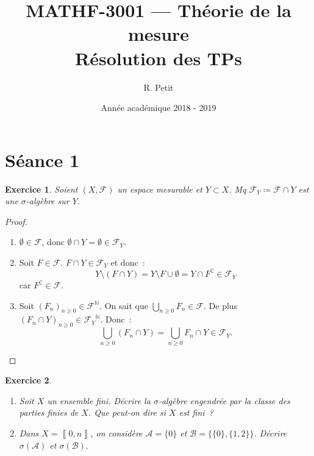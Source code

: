 \documentclass{article}
\title{MATHF-3001 --- Théorie de la mesure \\Résolution des TPs}
\author{R. Petit}
\date{Année académique 2018 - 2019}
\newtheorem{ex}{Exercice}[section]
\theoremstyle{definition}
\newcommand{\C}{\complement}
\newcommand{\N}{{\mathbb N}}
\newcommand{\intint}[2]{\left\llbracket#1, #2\right\rrbracket}
\begin{document}
\maketitle

\section{Séance 1}

\begin{ex} Soient $(X, \mathcal F)$ un espace mesurable et $Y \subset X$. Mq $\mathcal F_Y \coloneqq \mathcal F \cap Y$ est une $\sigma$-algèbre sur $Y$.
\end{ex}

\begin{proof}~
\begin{enumerate}
	\item $\emptyset \in \mathcal F$, donc $\emptyset \cap Y = \emptyset \in \mathcal F_Y$.
	\item Soit $F \in \mathcal F$. $F \cap Y \in \mathcal F_Y$ et donc~:
	\[Y \setminus (F \cap Y) = Y \setminus F \cup \emptyset = Y \cap F^\C \in \mathcal F_Y\]
	car $F^\C \in \mathcal F$.
	\item Soit $(F_n)_{n \geq 0} \in \mathcal F^\N$. On sait que $\bigcup_{n \geq 0}F_n \in \mathcal F$. De plus $(F_n \cap Y)_{n \geq 0} \in {\mathcal F_Y}^\N$. Donc~:
	\[\bigcup_{n \geq 0}(F_n \cap Y) = \bigcup_{n \geq 0}F_n \cap Y \in \mathcal F_Y.\]
\end{enumerate}
\end{proof}

\begin{ex}~
\begin{enumerate}
	\item Soit $X$ un ensemble fini. Décrire la $\sigma$-algèbre engendrée par la classe des parties finies de $X$. Que peut-on dire si $X$ est fini~?
	\item Dans $X = \intint 0n$, on considère $\mathcal A = \{0\}$ et $\mathcal B = \{\{0\}, \{1, 2\}\}$. Décrire $\sigma(\mathcal A)$ et $\sigma(\mathcal B)$.
\end{enumerate}
\end{ex}
\end{document}
